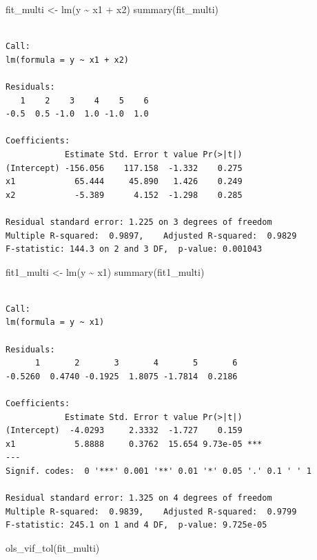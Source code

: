 \documentclass[
  letterpaper,
  DIV=11,
  numbers=noendperiod]{scrreprt}
\newenvironment{Shaded}{\begin{snugshade}}{\end{snugshade}}
\newcommand{\FunctionTok}[1]{\textcolor[rgb]{0.28,0.35,0.67}{#1}}
\newcommand{\NormalTok}[1]{\textcolor[rgb]{0.00,0.23,0.31}{#1}}
\newcommand{\OtherTok}[1]{\textcolor[rgb]{0.00,0.23,0.31}{#1}}
\newcommand{\SpecialCharTok}[1]{\textcolor[rgb]{0.37,0.37,0.37}{#1}}
\begin{document}
\begin{Shaded}
\begin{Highlighting}[]
\NormalTok{fit\_multi }\OtherTok{\textless{}{-}} \FunctionTok{lm}\NormalTok{(y }\SpecialCharTok{\textasciitilde{}}\NormalTok{ x1 }\SpecialCharTok{+}\NormalTok{ x2)}
\FunctionTok{summary}\NormalTok{(fit\_multi)}
\end{Highlighting}
\end{Shaded}

\begin{verbatim}

Call:
lm(formula = y ~ x1 + x2)

Residuals:
   1    2    3    4    5    6 
-0.5  0.5 -1.0  1.0 -1.0  1.0 

Coefficients:
            Estimate Std. Error t value Pr(>|t|)
(Intercept) -156.056    117.158  -1.332    0.275
x1            65.444     45.890   1.426    0.249
x2            -5.389      4.152  -1.298    0.285

Residual standard error: 1.225 on 3 degrees of freedom
Multiple R-squared:  0.9897,    Adjusted R-squared:  0.9829 
F-statistic: 144.3 on 2 and 3 DF,  p-value: 0.001043
\end{verbatim}

\begin{Shaded}
\begin{Highlighting}[]
\NormalTok{fit1\_multi }\OtherTok{\textless{}{-}} \FunctionTok{lm}\NormalTok{(y }\SpecialCharTok{\textasciitilde{}}\NormalTok{ x1)}
\FunctionTok{summary}\NormalTok{(fit1\_multi)}
\end{Highlighting}
\end{Shaded}

\begin{verbatim}

Call:
lm(formula = y ~ x1)

Residuals:
      1       2       3       4       5       6 
-0.5260  0.4740 -0.1925  1.8075 -1.7814  0.2186 

Coefficients:
            Estimate Std. Error t value Pr(>|t|)    
(Intercept)  -4.0293     2.3332  -1.727    0.159    
x1            5.8888     0.3762  15.654 9.73e-05 ***
---
Signif. codes:  0 '***' 0.001 '**' 0.01 '*' 0.05 '.' 0.1 ' ' 1

Residual standard error: 1.325 on 4 degrees of freedom
Multiple R-squared:  0.9839,    Adjusted R-squared:  0.9799 
F-statistic: 245.1 on 1 and 4 DF,  p-value: 9.725e-05
\end{verbatim}

\begin{Shaded}
\begin{Highlighting}[]
\FunctionTok{ols\_vif\_tol}\NormalTok{(fit\_multi)}
\end{Highlighting}
\end{Shaded}
\end{document}
